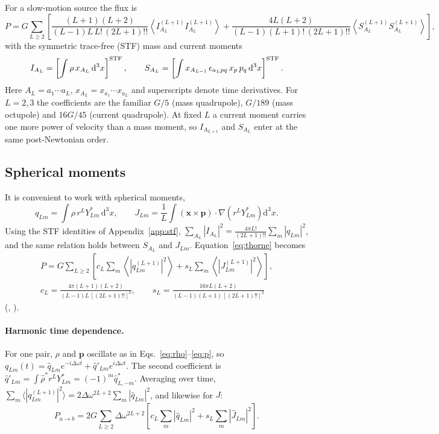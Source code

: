 \documentclass[11pt]{article}
\newcommand{\dd}{\mathrm{d}}
\newcommand{\code}[1]{\path{#1}}
\newcommand{\bx}{\mathbf x}
\newcommand{\bp}{\mathbf p}
\newcommand{\STF}{^{\rm STF}}
\begin{document}
For a slow-motion source the flux is~\cite{Thorne80}
\begin{equation}
P=G\sum_{L\ge2}\left[\frac{(L+1)(L+2)}{(L-1)L\,L!\,(2L+1)!!}\left\langle I^{(L+1)}_{A_L}I^{(L+1)}_{A_L}\right\rangle
+\frac{4L(L+2)}{(L-1)(L+1)!\,(2L+1)!!}\left\langle S^{(L+1)}_{A_L}S^{(L+1)}_{A_L}\right\rangle\right],
\label{eq:thorne}
\end{equation}
with the symmetric trace-free (STF) mass and current moments
\begin{equation}
I_{A_L}=\left[\int\rho\,x_{A_L}\,\dd^3x\right]\STF,\qquad
S_{A_L}=\left[\int x_{A_{L-1}}\,\epsilon_{a_Lpq}\,x_p\,p_q\,\dd^3x\right]\STF .
\end{equation}
Here $A_L=a_1\cdots a_L$, $x_{A_L}=x_{a_1}\cdots x_{a_L}$ and superscripts denote time derivatives. For $L=2,3$ the coefficients are the familiar $G/5$ (mass quadrupole), $G/189$ (mass octupole) and $16G/45$ (current quadrupole). At fixed $L$ a current moment carries one more power of velocity than a mass moment, so $I_{A_{L+1}}$ and $S_{A_L}$ enter at the same post-Newtonian order.

\subsection{Spherical moments}

It is convenient to work with spherical moments,
\begin{equation}
q_{Lm}=\int\rho\,r^LY^*_{Lm}\,\dd^3x,\qquad
J_{Lm}=\frac1L\int(\bx\times\bp)\cdot\nabla\!\left(r^LY^*_{Lm}\right)\dd^3x .
\label{eq:qJ}
\end{equation}
Using the STF identities of Appendix~\ref{app:stf}, $\sum_{A_L}|I_{A_L}|^2=\frac{4\pi L!}{(2L+1)!!}\sum_m|q_{Lm}|^2$, and the same relation holds between $S_{A_L}$ and $J_{Lm}$. Equation~\eqref{eq:thorne} becomes
\begin{gather}
P=G\sum_{L\ge2}\left[c_L\sum_m\left\langle|q^{(L+1)}_{Lm}|^2\right\rangle+s_L\sum_m\left\langle|J^{(L+1)}_{Lm}|^2\right\rangle\right],\nonumber\\
c_L=\frac{4\pi(L+1)(L+2)}{(L-1)L\,[(2L+1)!!]^2},\qquad
s_L=\frac{16\pi L(L+2)}{(L-1)(L+1)\,[(2L+1)!!]^2}
\label{eq:cs}
\end{gather}
(\code{gw_cmass}, \code{gw_ccurr}).

\paragraph{Harmonic time dependence.} For one pair, $\rho$ and $\bp$ oscillate as in Eqs.~\eqref{eq:rho}--\eqref{eq:p}, so $q_{Lm}(t)=\hat q_{Lm}e^{-i\Delta\omega t}+\hat q'_{Lm}e^{i\Delta\omega t}$. The second coefficient is $\hat q'_{Lm}=\int\hat\rho^*r^LY^*_{Lm}=(-1)^m\hat q^*_{L,-m}$. Averaging over time, $\sum_m\langle|q^{(L+1)}_{Lm}|^2\rangle=2\Delta\omega^{2L+2}\sum_m|\hat q_{Lm}|^2$, and likewise for $J$:
\begin{equation}
P_{a\to b}=2G\sum_{L\ge2}\Delta\omega^{2L+2}\left[c_L\sum_m|\hat q_{Lm}|^2+s_L\sum_m|\hat J_{Lm}|^2\right].
\label{eq:Ptr}
\end{equation}
\end{document}
